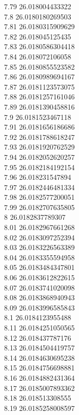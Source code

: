 {7.79	26.018004433322\\
7.8	26.0180180269503\\
7.81	26.0180315909629\\
7.82	26.018045125435\\
7.83	26.0180586304418\\
7.84	26.018072106058\\
7.85	26.0180855523582\\
7.86	26.0180989694167\\
7.87	26.0181123573075\\
7.88	26.0181257161046\\
7.89	26.0181390458816\\
7.9	26.0181523467118\\
7.91	26.0181656186686\\
7.92	26.0181788618247\\
7.93	26.0181920762529\\
7.94	26.0182052620257\\
7.95	26.0182184192154\\
7.96	26.018231547894\\
7.97	26.0182446481334\\
7.98	26.0182577200051\\
7.99	26.0182707635805\\
8	26.0182837789307\\
8.01	26.0182967661268\\
8.02	26.0183097252394\\
8.03	26.0183226563389\\
8.04	26.0183355594958\\
8.05	26.0183484347801\\
8.06	26.0183612822615\\
8.07	26.0183741020098\\
8.08	26.0183868940943\\
8.09	26.0183996585843\\
8.1	26.0184123955488\\
8.11	26.0184251050565\\
8.12	26.018437787176\\
8.13	26.0184504419757\\
8.14	26.0184630695238\\
8.15	26.0184756698881\\
8.16	26.0184882431364\\
8.17	26.0185007893362\\
8.18	26.018513308555\\
8.19	26.0185258008597\\
}

